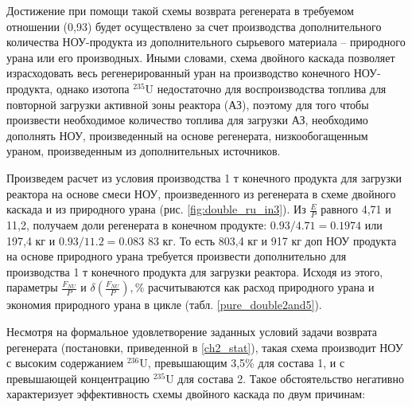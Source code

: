 Достижение при помощи такой схемы возврата регенерата в требуемом отношении (0,93) будет осуществлено за счет производства дополнительного количества НОУ-продукта из дополнительного сырьевого материала -- природного урана или его производных. Иными словами, схема двойного каскада позволяет израсходовать весь регенерированный уран на производство конечного НОУ-продукта, однако изотопа $^{235}$U недостаточно для воспроизводства топлива для повторной загрузки активной зоны реактора (АЗ), поэтому для того чтобы произвести необходимое количество топлива для загрузки АЗ, необходимо дополнять НОУ, произведенный на основе регенерата, низкообогащенным ураном, произведенным из дополнительных источников.

Произведем расчет из условия производства 1 т конечного продукта для загрузки реактора на основе смеси НОУ, произведенного из регенерата  в схеме двойного каскада и из природного урана (рис. \ref{fig:double_ru_in3}). Из $\frac{E}{P}$ равного 4,71 и 11,2, получаем доли регенерата в конечном продукте: $0.93/4.71=0.1974$ или 197,4 кг и $0.93/11.2=0.083$ 83 кг. То есть 803,4 кг и 917 кг доп НОУ продукта на основе природного урана требуется произвести дополнительно для производства 1 т конечного продукта для загрузки реактора. Исходя из этого, параметры $\frac{F_{NU}}{P}$ и $\delta(\frac{F_{NU}}{P}), \%$ расчитываются как расход природного урана и экономия природного урана в цикле (табл. \ref{pure_double2and5}).




Несмотря на формальное удовлетворение заданных условий задачи возврата регенерата (постановки, приведенной в \ref{ch2_stat}), такая схема производит НОУ с высоким содержанием $^{236}$U, превышающим 3,5\% для состава 1, и с превышающей концентрацию $^{235}$U для состава 2. Такое обстоятельство негативно характеризует эффективность схемы двойного каскада по двум причинам:

